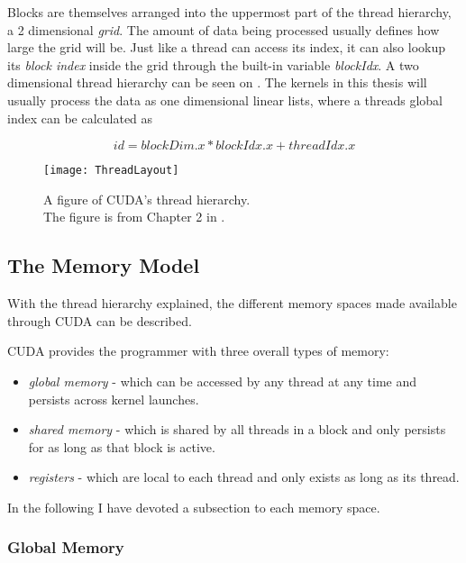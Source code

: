 
Blocks are themselves arranged into the uppermost part of the thread hierarchy,
a 2 dimensional \textit{grid}. The amount of data being processed usually
defines how large the grid will be. Just like a thread can access its index, it
can also lookup its \textit{block index} inside the grid through the built-in
variable \textit{blockIdx}. A two dimensional thread hierarchy can be seen on
. The kernels in this thesis will usually process the
data as one dimensional linear lists, where a threads global index can be
calculated as 

\begin{displaymath}
  id = blockDim.x * blockIdx.x + threadIdx.x
\end{displaymath}

\begin{figure}
  \centering
  \texttt{[image: ThreadLayout]}
  \caption[CUDA's thread hierarchy.]{A figure of CUDA's thread
    hierarchy.\\ The figure is from Chapter 2 in .}
  \label{fig:threadLayout}
\end{figure}




\subsection{The Memory Model}\label{sec:memoryModel}

With the thread hierarchy explained, the different memory spaces made available
through CUDA can be described.

CUDA provides the programmer with three overall types of memory:

\begin{itemize}
\item \textit{global memory} - which can be accessed by any thread at any time
  and persists across kernel launches.
\item \textit{shared memory} - which is shared by all threads in a block and
  only persists for as long as that block is active.
\item \textit{registers} - which are local to each thread and only exists as
  long as its thread.
\end{itemize}

In the following I have devoted a subsection to each memory space.

\subsubsection{Global Memory}

